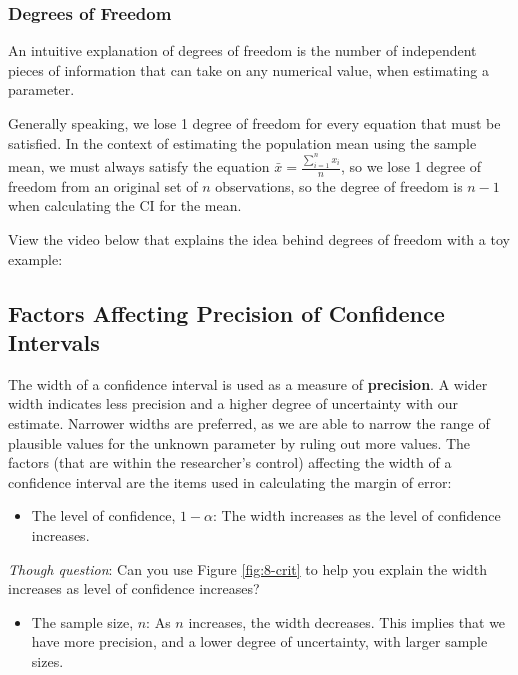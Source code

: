 \documentclass[
]{book}
\providecommand{\tightlist}{%
  \setlength{\itemsep}{0pt}\setlength{\parskip}{0pt}}
\begin{document}
\subsubsection{Degrees of Freedom}\label{df}

An intuitive explanation of degrees of freedom is the number of independent pieces of information that can take on any numerical value, when estimating a parameter.

Generally speaking, we lose 1 degree of freedom for every equation that must be satisfied. In the context of estimating the population mean using the sample mean, we must always satisfy the equation \(\bar{x} = \frac{\sum_{i=1}^n x_i}{n}\), so we lose 1 degree of freedom from an original set of \(n\) observations, so the degree of freedom is \(n-1\) when calculating the CI for the mean.

View the video below that explains the idea behind degrees of freedom with a toy example:

\subsection{Factors Affecting Precision of Confidence Intervals}\label{factors-affecting-precision-of-confidence-intervals}

The width of a confidence interval is used as a measure of \textbf{precision}. A wider width indicates less precision and a higher degree of uncertainty with our estimate. Narrower widths are preferred, as we are able to narrow the range of plausible values for the unknown parameter by ruling out more values. The factors (that are within the researcher's control) affecting the width of a confidence interval are the items used in calculating the margin of error:

\begin{itemize}
\tightlist
\item
  The level of confidence, \(1 - \alpha\): The width increases as the level of confidence increases.
\end{itemize}

\emph{Though question}: Can you use Figure \ref{fig:8-crit} to help you explain the width increases as level of confidence increases?

\begin{itemize}
\tightlist
\item
  The sample size, \(n\): As \(n\) increases, the width decreases. This implies that we have more precision, and a lower degree of uncertainty, with larger sample sizes.
\end{itemize}
\end{document}
